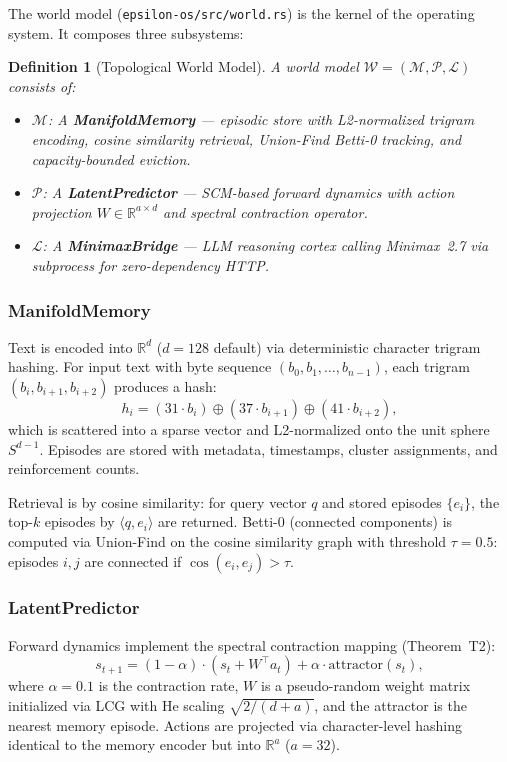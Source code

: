 \documentclass[11pt, a4paper]{article}
\theoremstyle{proofform}
\numberwithin{innerpoints}{subsection}
\numberwithin{disproof}{subsection}
\theoremstyle{mathproof}
\newtheorem{definition}[theorem]{Definition}
\begin{document}
The world model (\texttt{epsilon-os/src/world.rs}) is the kernel of the operating system. It composes three subsystems:

\begin{definition}[Topological World Model]
A world model $\mathcal{W} = (\mathcal{M}, \mathcal{P}, \mathcal{L})$ consists of:
\begin{itemize}[nosep]
  \item $\mathcal{M}$: A \textbf{ManifoldMemory} --- episodic store with L2-normalized trigram encoding, cosine similarity retrieval, Union-Find Betti-0 tracking, and capacity-bounded eviction.
  \item $\mathcal{P}$: A \textbf{LatentPredictor} --- SCM-based forward dynamics with action projection $W \in \mathbb{R}^{a \times d}$ and spectral contraction operator.
  \item $\mathcal{L}$: A \textbf{MinimaxBridge} --- LLM reasoning cortex calling Minimax~2.7 via subprocess for zero-dependency HTTP.
\end{itemize}
\end{definition}

\subsubsection{ManifoldMemory}

Text is encoded into $\mathbb{R}^d$ ($d=128$ default) via deterministic character trigram hashing. For input text with byte sequence $(b_0, b_1, \ldots, b_{n-1})$, each trigram $(b_i, b_{i+1}, b_{i+2})$ produces a hash:
\[
h_i = (31 \cdot b_i) \oplus (37 \cdot b_{i+1}) \oplus (41 \cdot b_{i+2}),
\]
which is scattered into a sparse vector and L2-normalized onto the unit sphere $S^{d-1}$. Episodes are stored with metadata, timestamps, cluster assignments, and reinforcement counts.

Retrieval is by cosine similarity: for query vector $q$ and stored episodes $\{e_i\}$, the top-$k$ episodes by $\langle q, e_i \rangle$ are returned. Betti-0 (connected components) is computed via Union-Find on the cosine similarity graph with threshold $\tau = 0.5$: episodes $i, j$ are connected if $\cos(e_i, e_j) > \tau$.

\subsubsection{LatentPredictor}

Forward dynamics implement the spectral contraction mapping (Theorem~T2):
\[
s_{t+1} = (1 - \alpha) \cdot (s_t + W^\top a_t) + \alpha \cdot \text{attractor}(s_t),
\]
where $\alpha = 0.1$ is the contraction rate, $W$ is a pseudo-random weight matrix initialized via LCG with He scaling $\sqrt{2/(d + a)}$, and the attractor is the nearest memory episode. Actions are projected via character-level hashing identical to the memory encoder but into $\mathbb{R}^a$ ($a = 32$).
\end{document}
